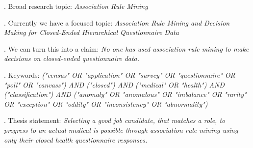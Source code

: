 \documentclass{ruthesis}
\begin{document}
\thispagestyle{empty}

\noindent









\par
{}. Broad research topic: \textit{Association Rule Mining}

. Currently we have a focused topic: \textit{Association Rule Mining and Decision Making for Closed-Ended Hierarchical Questionnaire Data}

. We can turn this into a claim: \textit{No one has used association rule mining to make decisions on closed-ended questionnaire data.}

. Keywords: \textit{("census" OR "application" OR "survey" OR "questionnaire" OR "poll" OR "canvass") AND
	("closed") AND
	("medical" OR "health") AND
	("classification") AND
	("anomaly" OR "anomalous" OR "imbalance" OR "rarity" OR "exception" OR "oddity" OR "inconsistency" OR "abnormality")}


. Thesis statement: \textit{Selecting a good job candidate, that matches a role, to progress to an actual medical is possible through association rule mining using only their closed health questionnaire responses.}



\end{document}
